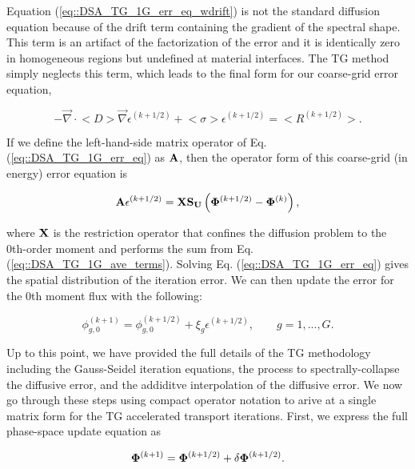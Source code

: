 \noindent Equation (\ref{eq::DSA_TG_1G_err_eq_wdrift}) is not the standard diffusion equation because of the drift term containing the gradient of the spectral shape. This term is an artifact of the factorization of the error and it is identically zero in homogeneous regions but undefined at material interfaces. The TG method simply neglects this term, which leads to the final form for our coarse-grid error equation,

\begin{equation}
\label{eq::DSA_TG_1G_err_eq}
-\vec{\nabla} \cdot \big< D \big> \vec{\nabla} \epsilon^{(k+1/2)}  + \big< \sigma \big> \epsilon^{(k+1/2)}  = \big< R^{(k+1/2)} \big> .
\end{equation}

\noindent If we define the left-hand-side matrix operator of Eq. (\ref{eq::DSA_TG_1G_err_eq}) as ${\bf A}$, then the operator form of this coarse-grid (in energy) error equation is 

\begin{equation}
\label{eq::DSA_TG_1G_err_eq_op}
{\bf A} \epsilon^{(k+1/2)}  =  {\bf X} {\bf S_{U}} \left(  {\bf \Phi}^{(k+1/2)} - {\bf \Phi}^{(k)}  \right),
\end{equation}

\noindent where ${\bf X}$ is the restriction operator that confines the diffusion problem to the 0th-order moment and performs the sum from Eq. (\ref{eq::DSA_TG_1G_ave_terms}). Solving Eq. (\ref{eq::DSA_TG_1G_err_eq}) gives the spatial distribution of the iteration error. We can then update the error for the 0th moment flux with the following:

\begin{equation}
\label{eq::DSA_TG_err_update}
 \phi_{g,0}^{(k+1)} =  \phi_{g,0}^{(k+1/2)}  + \xi_g \epsilon^{(k+1/2)}, \qquad g=1,...,G .
\end{equation}

Up to this point, we have provided the full details of the TG methodology including the Gauss-Seidel iteration equations, the process to spectrally-collapse the diffusive error, and the addiditve interpolation of the diffusive error. We now go through these steps using compact operator notation to arive at a single matrix form for the TG accelerated transport iterations. First, we express the full phase-space update equation as 

\begin{equation}
\label{eq::DSA_TG_update_op}
 {\bf \Phi}^{(k+1)} =  {\bf \Phi}^{(k+1/2)}  + \delta {\bf \Phi}^{(k+1/2)} .
\end{equation}

